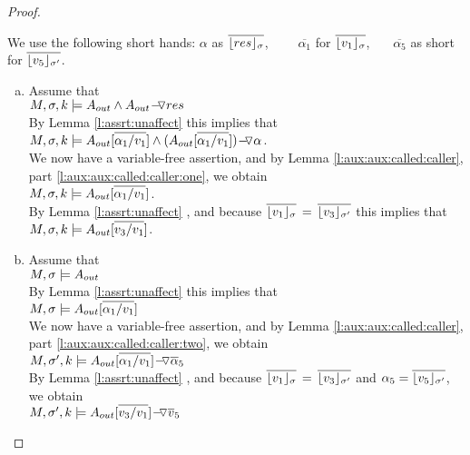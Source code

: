 \begin{proof}$ ~ $

We use the following short hands: $\alpha$ as   $\overline {\interpret {\sigma} {res}}$, 
\ \ \ \ 
$\overline {\alpha_1}$   for $\overline {\interpret {\sigma} {v_1}}$, \ \ \ 
$\overline {\alpha_5}$ as short for $\overline {\interpret {\sigma'} {v_5}}$.

\newcommand{\substOne}{[\overline{\alpha_1/v_1}]}
\newcommand{\substFive}{[\overline{\alpha_5/v_5}]}

\begin{enumerate}[a.]
\item
Assume that \\
$\satDAssertFrom M  \sigma k   {\Aout  \wedge  {\PushASLong  {res} {\Aout} } } $\\
	By Lemma \ref{l:assrt:unaffect}    this  implies that \\
$ \satDAssertFrom M  \sigma k   {\Aout\substOne  \wedge  {\PushASLong  {\alpha} {(\Aout\substOne)} } }$.\\
We now have a variable-free assertion,
and by Lemma \ref{l:aux:aux:called:caller}, part \ref{l:aux:aux:called:caller:one}, we obtain\\
$ \satDAssertFrom M  \sigma k   {\Aout\substOne} $.\\
By Lemma \ref{l:assrt:unaffect}   , and because $ \overline {\interpret {\sigma} {v_1} }\, =\,  \overline {\interpret {\sigma'}  {v_3} }$  this  implies that \\
$ \satDAssertFrom M  \sigma k   {\Aout[\overline { v_3/v_1}] } $.
\item
Assume that \\
$M,  \sigma\models \Aout  $\\
By Lemma \ref{l:assrt:unaffect}    this  implies that \\
$M,  \sigma\models \Aout\substOne$\\
We now have a variable-free assertion,
and by Lemma \ref{l:aux:aux:called:caller}, part \ref{l:aux:aux:called:caller:two}, we obtain\\
$ \satDAssertFrom M  {\sigma'} k    {\PushASLong {\overline \alpha_5} {\Aout\substOne}}$\\
By Lemma \ref{l:assrt:unaffect}   , and because $ \overline {\interpret {\sigma} {v_1} }\, =\,  \overline {\interpret {\sigma'}  {v_3} }$  and $\alpha_5 = \overline {\interpret {\sigma'} {v_5}}$, we obtain \\
$ \satDAssertFrom M  {\sigma'} k    {\PushASLong {\overline v_5} {\Aout[\overline {v_3/v_1}]}}$
\end{enumerate}

\end{proof}



